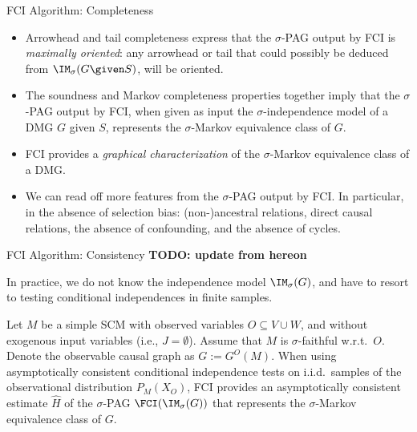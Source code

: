 \begin{frame}{FCI Algorithm: Completeness}
  \begin{itemize}
    \item Arrowhead and tail completeness express that the $\sigma$-PAG output by FCI is \emph{maximally oriented}: any arrowhead or tail that could possibly be deduced from $\IM_\sigma(G \given S)$, will be oriented.
    \item The soundness and Markov completeness properties together imply that the $\sigma$-PAG output by FCI, when given as input the $\sigma$-independence model of a DMG $G$ given $S$, represents the $\sigma$-Markov equivalence class of $G$.
    \item FCI provides a \emph{graphical characterization} of the $\sigma$-Markov equivalence class of a DMG.
    \item We can read off more features from the $\sigma$-PAG output by FCI. In particular, in the absence of selection bias:
      (non-)ancestral relations, direct causal relations, the absence of confounding, and the absence of cycles. 
  \end{itemize}
\end{frame}

\begin{frame}{FCI Algorithm: Consistency}
\textbf{TODO: update from hereon}

In practice, we do not know the independence model $\IM_\sigma(G)$, and have to resort to testing conditional independences in finite samples.
  \begin{Cor}
  Let $M$ be a simple SCM with observed variables $O \subseteq V \cup W$, and without exogenous input variables (i.e., $J = \emptyset$).
  Assume that $M$ is $\sigma$-faithful w.r.t.\ $O$.
  Denote the observable causal graph as $G := G^O(M)$.
  When using asymptotically consistent conditional independence tests on i.i.d.\ samples of the observational distribution $P_{M}(X_O)$, FCI provides an asymptotically consistent estimate $\hat{H}$ of the $\sigma$-PAG $\FCI(\IM_\sigma(G))$ that represents the $\sigma$-Markov equivalence class of $G$.
\end{Cor}
\end{frame}

